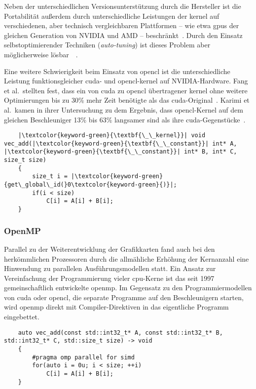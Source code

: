 Neben der unterschiedlichen Versionsunterstützung durch die Hersteller ist die Portabilität außerdem durch
unterschiedliche Leistungen der \gls{kernel} auf verschiedenen, aber technisch vergleichbaren Plattformen -- wie etwa
\gls{gpu}s der gleichen Generation von NVIDIA{\textregistered} und AMD -- beschränkt~\cite{duweb}. Durch den Einsatz
selbstoptimierender Techniken (\textit{auto-tuning}) ist dieses Problem aber möglicherweise
lösbar~\cite{duweb}~\cite{fangvar}.

Eine weitere Schwierigkeit beim Einsatz von \gls{opencl}  ist die unterschiedliche Leistung funktionsgleicher
\gls{cuda}- und \gls{opencl}-\gls{kernel} auf NVIDIA{\textregistered}-Hardware. Fang et al.\ stellten fest, dass ein
von \gls{cuda} zu \gls{opencl} übertragener \gls{kernel} ohne weitere Optimierungen bis zu 30\% mehr Zeit benötigte als
das \gls{cuda}-Original~\cite{fangvar}. Karimi et al.\ kamen in ihrer Untersuchung zu dem Ergebnis, dass
\gls{opencl}-Kernel auf dem gleichen Beschleuniger 13\% bis 63\% langsamer sind als ihre
\gls{cuda}-Gegenstücke~\cite{karimdick}.

\begin{verbatim}
    |\textcolor{keyword-green}{\textbf{\_\_kernel}}| void vec_add(|\textcolor{keyword-green}{\textbf{\_\_constant}}| int* A, |\textcolor{keyword-green}{\textbf{\_\_constant}}| int* B, int* C, size_t size)
    {
        size_t i = |\textcolor{keyword-green}{get\_global\_id(}0\textcolor{keyword-green}{)}|;
        if(i < size)
            C[i] = A[i] + B[i];
    }
\end{verbatim}

\subsubsection{OpenMP{\textregistered}}

Parallel zu der Weiterentwicklung der Grafikkarten fand auch bei den herkömmlichen Prozessoren durch die allmähliche
Erhöhung der Kernanzahl eine Hinwendung zu parallelen Ausführungsmodellen statt. Ein Ansatz zur Vereinfachung der
Programmierung vieler \gls{cpu}-Kerne ist das seit 1997 gemeinschaftlich entwickelte \gls{openmp}. Im Gegensatz zu den
Programmiermodellen von \gls{cuda} oder \gls{opencl}, die separate Programme auf den Beschleunigern starten, wird
\gls{openmp} direkt mit Compiler-Direktiven in das eigentliche Programm eingebettet.

\begin{verbatim}
    auto vec_add(const std::int32_t* A, const std::int32_t* B, std::int32_t* C, std::size_t size) -> void
    {
        #pragma omp parallel for simd
        for(auto i = 0u; i < size; ++i)
            C[i] = A[i] + B[i];
    }
\end{verbatim}


